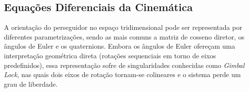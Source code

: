 \subsection{Equações Diferenciais da Cinemática}
\label{sec:equacoes_cinematica}

A orientação do perseguidor no espaço tridimensional pode ser representada por diferentes parametrizações, sendo as mais comuns a matriz de cosseno diretor, os ângulos de Euler e os quaternions.
Embora os ângulos de Euler ofereçam uma interpretação geométrica direta (rotações sequenciais em torno de eixos predefinidos), essa representação sofre de singularidades conhecidas como \emph{Gimbal Lock}, nas quais dois eixos de rotação tornam-se colineares e o sistema perde um grau de liberdade.












